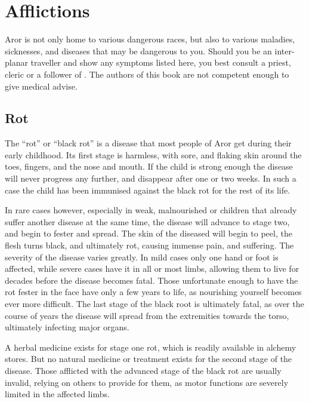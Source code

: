 \section{Afflictions}
\label{sec:Afflictions}

Aror is not only home to various dangerous races, but also to various
maladies, sicknesses, and diseases that may be dangerous to you. Should you be
an inter-planar traveller and show any symptoms listed here, you best consult
a priest, cleric or a follower of . The authors of this
book are not competent enough to give medical advise.

\subsection{Rot}
\label{sec:Rot}

The ``rot'' or ``black rot'' is a disease that most people of Aror get during
their early childhood. Its first stage is harmless, with sore, and flaking
skin around the toes, fingers, and the nose and mouth. If the child is strong
enough the disease will never progress any further, and disappear after one or
two weeks. In such a case the child has been immunised against the black rot
for the rest of its life.

In rare cases however, especially in weak, malnourished or children that
already suffer another disease at the same time, the disease will advance to
stage two, and begin to fester and spread. The skin of the diseased will begin
to peel, the flesh turns black, and ultimately rot, causing immense pain, and
suffering. The severity of the disease varies greatly. In mild cases only one
hand or foot is affected, while severe cases have it in all or most limbs,
allowing them to live for decades before the disease becomes fatal. Those
unfortunate enough to have the rot fester in the face have only a few years to
life, as nourishing yourself becomes ever more difficult. The last stage of
the black root is ultimately fatal, as over the course of years the disease
will spread from the extremities towards the torso, ultimately infecting major
organs.

A herbal medicine exists for stage one rot, which is readily available in
alchemy stores. But no natural medicine or treatment exists for the second
stage of the disease. Those afflicted with the advanced stage of the black rot
are usually invalid, relying on others to provide for them, as motor functions
are severely limited in the affected limbs.

